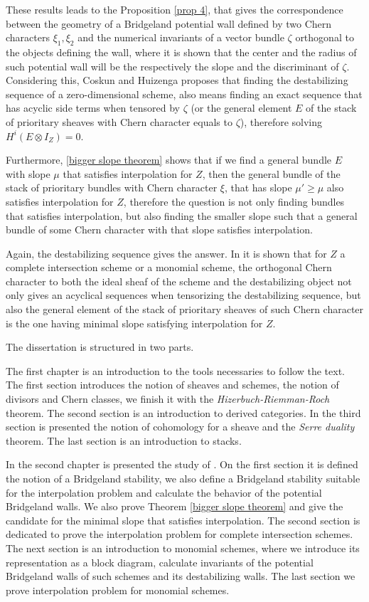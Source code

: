 These results leads to the Proposition \ref{prop 4}, that gives the correspondence between the geometry of a Bridgeland potential wall defined by two Chern characters $\xi_1,\xi_2$ and the numerical invariants of a vector bundle $\zeta$ orthogonal to the objects defining the wall, where it is shown that the center and the radius of such potential wall will be the respectively the slope and the discriminant of $\zeta$. Considering this, Coskun and Huizenga proposes that finding the destabilizing sequence of a zero-dimensional scheme, also means finding an exact sequence that has acyclic side terms when tensored by $\zeta$ (or the general element $E$ of the stack of prioritary sheaves with Chern character equals to $\zeta$), therefore solving $H^i(E\otimes I_Z)=0$.

Furthermore, \ref{bigger slope theorem} shows that if we find a general bundle $E$ with slope $\mu$ that satisfies interpolation for $Z$, then the general bundle of the stack of prioritary bundles with Chern character $\xi$, that has slope $\mu'\geq\mu$ also satisfies interpolation for $Z$, therefore the question is not only finding bundles that satisfies interpolation, but also finding the smaller slope such that a general bundle of some Chern character with that slope satisfies interpolation. 



Again, the destabilizing sequence gives the answer. In \cite{COSKUN} it is shown that for $Z$ a complete intersection scheme or a monomial scheme, the orthogonal Chern character to both the ideal sheaf of the scheme and the destabilizing object not only gives an acyclical sequences when tensorizing the destabilizing sequence, but also the general element of the stack of prioritary sheaves of such Chern character is the one having minimal slope satisfying interpolation for $Z$.

The dissertation is structured in two parts.

The first chapter is an introduction to the tools necessaries to follow the text. The first section introduces the notion of sheaves and schemes, the notion of divisors and Chern classes, we finish it with the \textit{Hizerbuch-Riemman-Roch} theorem. The second section is an introduction to derived categories. In the third section is presented the notion of cohomology for a sheave and the \textit{Serre duality} theorem. The last section is an introduction to stacks.

In the second chapter is presented the study of \cite{COSKUN}. On the first section it is defined the notion of a Bridgeland stability, we also define a Bridgeland stability suitable for the interpolation problem and calculate the behavior of the potential Bridgeland walls. We also prove Theorem \ref{bigger slope theorem} and give the candidate for the minimal slope that satisfies interpolation. The second section is dedicated to prove the interpolation problem for complete intersection schemes. The next section is an introduction to monomial schemes, where we introduce its representation as a block diagram, calculate invariants of the potential Bridgeland walls of such schemes and its destabilizing walls. The last section we prove interpolation problem for monomial schemes.
